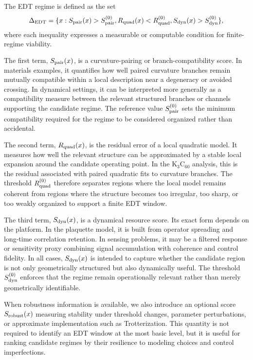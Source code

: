 ﻿\documentclass[aps,prx,reprint,superscriptaddress,longbibliography,floatfix]{revtex4-2}
\begin{document}
The EDT regime is defined as the set
\begin{equation}
\Delta_{\rm EDT}
=
\{x: S_{\rm pair}(x) > S_{\rm pair}^{(0)},
R_{\rm quad}(x) < R_{\rm quad}^{(0)},
S_{\rm dyn}(x) > S_{\rm dyn}^{(0)} \},
\end{equation}
where each inequality expresses a measurable or computable condition for finite-regime viability.

The first term, $S_{\rm pair}(x)$, is a curvature-pairing or branch-compatibility score. In materials examples, it quantifies how well paired curvature branches remain mutually compatible within a local description near a degeneracy or avoided crossing. In dynamical settings, it can be interpreted more generally as a compatibility measure between the relevant structured branches or channels supporting the candidate regime. The reference value $S_{\rm pair}^{(0)}$ sets the minimum compatibility required for the regime to be considered organized rather than accidental.

The second term, $R_{\rm quad}(x)$, is the residual error of a local quadratic model. It measures how well the relevant structure can be approximated by a stable local expansion around the candidate operating point. In the K$_3$C$_{60}$ analysis, this is the residual associated with paired quadratic fits to curvature branches. The threshold $R_{\rm quad}^{(0)}$ therefore separates regions where the local model remains coherent from regions where the structure becomes too irregular, too sharp, or too weakly organized to support a finite EDT window.

The third term, $S_{\rm dyn}(x)$, is a dynamical resource score. Its exact form depends on the platform. In the plaquette model, it is built from operator spreading and long-time correlation retention. In sensing problems, it may be a filtered response or sensitivity proxy combining signal accumulation with coherence and control fidelity. In all cases, $S_{\rm dyn}(x)$ is intended to capture whether the candidate region is not only geometrically structured but also dynamically useful. The threshold $S_{\rm dyn}^{(0)}$ enforces that the regime remain operationally relevant rather than merely geometrically identifiable.

When robustness information is available, we also introduce an optional score $S_{\rm robust}(x)$ measuring stability under threshold changes, parameter perturbations, or approximate implementation such as Trotterization. This quantity is not required to identify an EDT window at the most basic level, but it is useful for ranking candidate regimes by their resilience to modeling choices and control imperfections.
\end{document}
